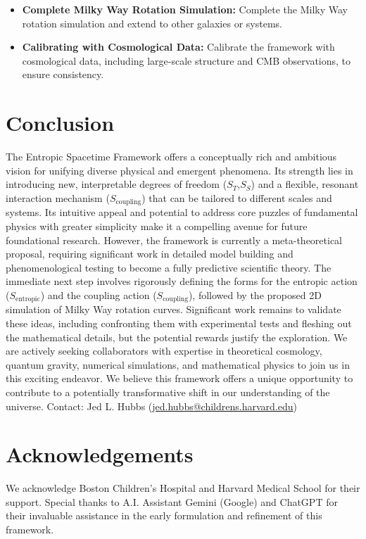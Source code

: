 \documentclass[11pt,a4paper]{article} %
\newcommand{\ST}{S_T}
\newcommand{\SSp}{S_S} %
\newcommand{\Scoupling}{S_{\text{coupling}}}
\newcommand{\Sentropic}{S_{\text{entropic}}}
\begin{document}
\begin{itemize}
    \item \textbf{Complete Milky Way Rotation Simulation:} Complete the Milky Way rotation simulation and extend to other galaxies or systems.
    \item \textbf{Calibrating with Cosmological Data:} Calibrate the framework with cosmological data, including large-scale structure and CMB observations, to ensure consistency.
\end{itemize}

\section{Conclusion}
The Entropic Spacetime Framework offers a conceptually rich and ambitious vision for unifying diverse physical and emergent phenomena. Its strength lies in introducing new, interpretable degrees of freedom ($\ST$,$\SSp$) and a flexible, resonant interaction mechanism ($\Scoupling$) that can be tailored to different scales and systems. Its intuitive appeal and potential to address core puzzles of fundamental physics with greater simplicity make it a compelling avenue for future foundational research. However, the framework is currently a meta-theoretical proposal, requiring significant work in detailed model building and phenomenological testing to become a fully predictive scientific theory. The immediate next step involves rigorously defining the forms for the entropic action ($\Sentropic$) and the coupling action ($\Scoupling$), followed by the proposed 2D simulation of Milky Way rotation curves. Significant work remains to validate these ideas, including confronting them with experimental tests and fleshing out the mathematical details, but the potential rewards justify the exploration. We are actively seeking collaborators with expertise in theoretical cosmology, quantum gravity, numerical simulations, and mathematical physics to join us in this exciting endeavor. We believe this framework offers a unique opportunity to contribute to a potentially transformative shift in our understanding of the universe. Contact: Jed L. Hubbs (\url{jed.hubbs@childrens.harvard.edu})

\section*{Acknowledgements}
We acknowledge Boston Children's Hospital and Harvard Medical School for their support. Special thanks to A.I. Assistant Gemini (Google) and ChatGPT for their invaluable assistance in the early formulation and refinement of this framework.
\end{document}
